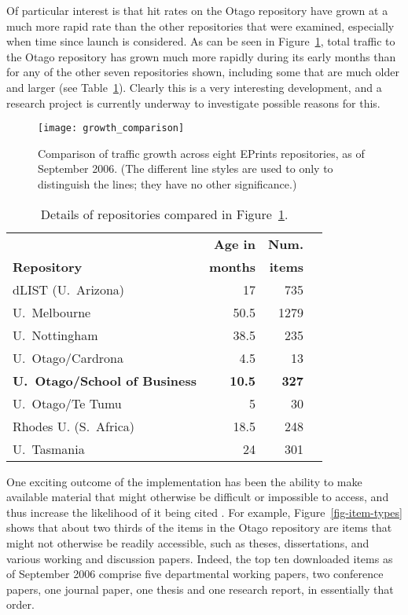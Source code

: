 \documentclass[12pt,pdftex,a4paper,titlepage]{article}
\begin{document}
Of particular interest is that hit rates on the Otago repository have grown at a much more rapid rate than the other repositories that were examined, especially when time since launch is considered. As can be seen in Figure~\ref{fig-growth-comparison}, total traffic to the Otago repository has grown much more rapidly during its early months than for any of the other seven repositories shown, including some that are much older and larger (see Table~\ref{tab-reopsitories}). Clearly this is a very interesting development, and a research project is currently underway to investigate possible reasons for this.


\begin{figure}
	\centering
	\texttt{[image: growth\_comparison]}
	\caption{Comparison of traffic growth across eight EPrints repositories, as of September 2006. (The different line styles are used to only to distinguish the lines; they have no other significance.)}
	\label{fig-growth-comparison}
\end{figure}


\begin{table}
	\caption{Details of repositories compared in Figure~\ref{fig-growth-comparison}.}
	\label{tab-reopsitories}
	\begin{center}
		\begin{tabular}{lrrl}
													&	\textbf{Age in}	&	\textbf{Num.}	\\
			\textbf{Repository}						&	\textbf{months}	&	\textbf{items}	\\
			\hline
			dLIST (U.\ Arizona)						&	17				&	735	\\
			U.\ Melbourne							&	50.5			&	1279	\\
			U.\ Nottingham							&	38.5			&	235	\\
			U.\ Otago/Cardrona						&	4.5				&	13	\\
			\textbf{U.\ Otago/School of Business}	&	\textbf{10.5}	&	\textbf{327}	\\
			U.\ Otago/Te Tumu						&	5				&	30	\\
			Rhodes U. (S.\ Africa)					&	18.5			&	248	\\
			U.\ Tasmania							&	24				&	301	\\
		\end{tabular}
	\end{center}
\end{table}


One exciting outcome of the implementation has been the ability to make  available material that might otherwise be difficult or impossible to access, and thus increase the likelihood of it being cited \cite{Harn-S-2005-research,Hajj-C-2005-citation}. For example, Figure~\ref{fig-item-types} shows that about two thirds of the items in the Otago repository are items that might not otherwise be readily accessible, such as theses, dissertations, and various working and discussion papers. Indeed, the top ten downloaded items as of September 2006 comprise five departmental working papers, two conference papers, one journal paper, one thesis and one research report, in essentially that order.
\end{document}
